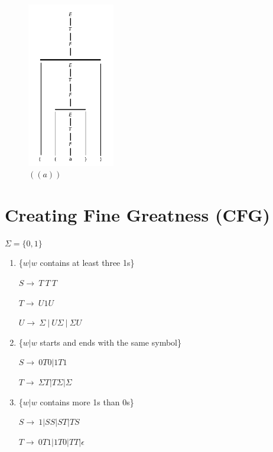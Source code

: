 \documentclass[10pt,reqno,sumlimits]{amsart}
\theoremstyle{plain}
\theoremstyle{definition}
\newcommand{\1}{{\bf 1}}
\numberwithin{equation}{section}
\begin{document}
\begin{figure}[htbp]
\centerline{
    \mbox{\includegraphics[width=1.5in]{figures/3_1_d.pdf}}
  }
  \caption{$((a))$}
  \label{fig:fit}
\end{figure}

\section {Creating Fine Greatness (CFG)}
\hspace{0.2in}$\Sigma = \{0,1\}$
\begin{enumerate}
\item \{$w|w$ contains at least three 1s\}

\hspace{0.3in}$S\rightarrow\ T\ T\ T$

\hspace{0.3in}$T\rightarrow\ U1U$

\hspace{0.3in}$U\rightarrow\ \Sigma\ |\ U\Sigma\ |\ \Sigma U$

\item \{$w|w$ starts and ends with the same symbol\}

\hspace{0.3in}$S\rightarrow\ 0T0 | 1T1$

\hspace{0.3in}$T\rightarrow\ \Sigma T | T\Sigma | \Sigma$

\item \{$w|w$ contains more 1s than 0s\}

\hspace{0.3in}$S\rightarrow\ 1 | SS | ST | TS$

\hspace{0.3in}$T\rightarrow\ 0T1 | 1T0 | TT | \epsilon$

\end{enumerate}
\end{document}
